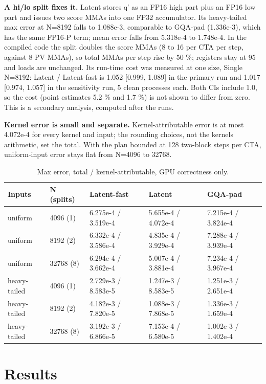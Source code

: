 \documentclass[conference]{IEEEtran}
\begin{document}
\textbf{A hi/lo split fixes it.} Latent stores q′ as an FP16 high part plus an FP16 low part and issues two score MMAs into one FP32 accumulator. Its heavy-tailed max error at N=8192 falls to 1.088e-3, comparable to GQA-pad (1.336e-3), which has the same FP16-P term; mean error falls from 5.318e-4 to 1.748e-4. In the compiled code the split doubles the score MMAs (8 to 16 per CTA per step, against 8 PV MMAs), so total MMAs per step rise by 50 \%; registers stay at 95 and loads are unchanged. Its run-time cost was measured at one size, Single N=8192: Latent / Latent-fast is 1.052 {[}0.999, 1.089{]} in the primary run and 1.017 {[}0.974, 1.057{]} in the sensitivity run, 5 clean processes each. Both CIs include 1.0, so the cost (point estimates 5.2 \% and 1.7 \%) is not shown to differ from zero. This is a secondary analysis, computed after the runs.

\textbf{Kernel error is small and separate.} Kernel-attributable error is at most 4.072e-4 for every kernel and input; the rounding choices, not the kernels\textquotesingle{} arithmetic, set the total. With the plan bounded at 128 two-block steps per CTA, uniform-input error stays flat from N=4096 to 32768.

\begin{table}[t]
\centering
\caption{Max \textbar error\textbar, total / kernel-attributable, GPU correctness only.}\label{tab:3}
\begin{tabular}{lllll}
\toprule
Inputs & N (splits) & Latent-fast & Latent & GQA-pad \\
\midrule
uniform & 4096 (1) & 6.275e-4 / 3.519e-4 & 5.655e-4 / 4.072e-4 & 7.215e-4 / 3.824e-4 \\
uniform & 8192 (2) & 6.332e-4 / 3.586e-4 & 4.835e-4 / 3.929e-4 & 7.288e-4 / 3.939e-4 \\
uniform & 32768 (8) & 6.294e-4 / 3.662e-4 & 5.007e-4 / 3.881e-4 & 7.234e-4 / 3.967e-4 \\
heavy-tailed & 4096 (1) & 2.729e-3 / 8.583e-5 & 1.247e-3 / 8.583e-5 & 1.251e-3 / 2.651e-4 \\
heavy-tailed & 8192 (2) & 4.182e-3 / 7.820e-5 & 1.088e-3 / 7.868e-5 & 1.336e-3 / 1.659e-4 \\
heavy-tailed & 32768 (8) & 3.192e-3 / 6.866e-5 & 7.153e-4 / 6.580e-5 & 1.002e-3 / 1.402e-4 \\
\bottomrule
\end{tabular}
\end{table}

\section{Results}\label{sec:6}
\end{document}
